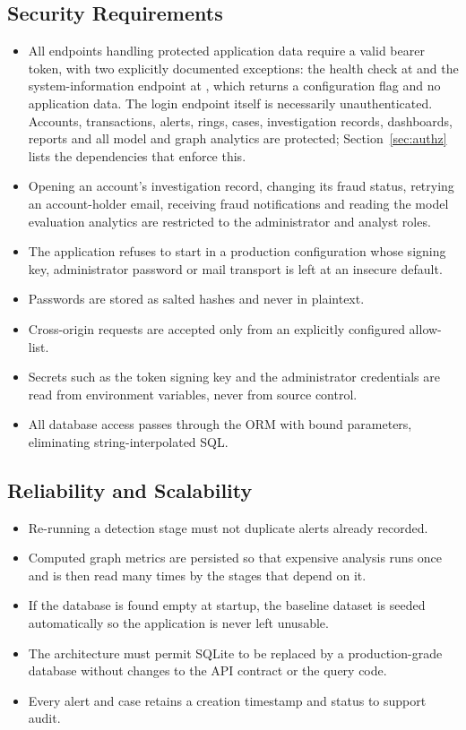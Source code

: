\subsection{Security Requirements}
\begin{itemize}
  \item All endpoints handling protected application data require a valid bearer token, with two explicitly documented exceptions: the health check at  and the system-information endpoint at , which returns a configuration flag and no application data. The login endpoint itself is necessarily unauthenticated. Accounts, transactions, alerts, rings, cases, investigation records, dashboards, reports and all model and graph analytics are protected; Section~\ref{sec:authz} lists the dependencies that enforce this.
  \item Opening an account's investigation record, changing its fraud status, retrying an account-holder email, receiving fraud notifications and reading the model evaluation analytics are restricted to the administrator and analyst roles.
  \item The application refuses to start in a production configuration whose signing key, administrator password or mail transport is left at an insecure default.
  \item Passwords are stored as salted hashes and never in plaintext.
  \item Cross-origin requests are accepted only from an explicitly configured allow-list.
  \item Secrets such as the token signing key and the administrator credentials are read from environment variables, never from source control.
  \item All database access passes through the ORM with bound parameters, eliminating string-interpolated SQL.
\end{itemize}

\subsection{Reliability and Scalability}
\begin{itemize}
  \item Re-running a detection stage must not duplicate alerts already recorded.
  \item Computed graph metrics are persisted so that expensive analysis runs once and is then read many times by the stages that depend on it.
  \item If the database is found empty at startup, the baseline dataset is seeded automatically so the application is never left unusable.
  \item The architecture must permit SQLite to be replaced by a production-grade database without changes to the API contract or the query code.
  \item Every alert and case retains a creation timestamp and status to support audit.
\end{itemize}
